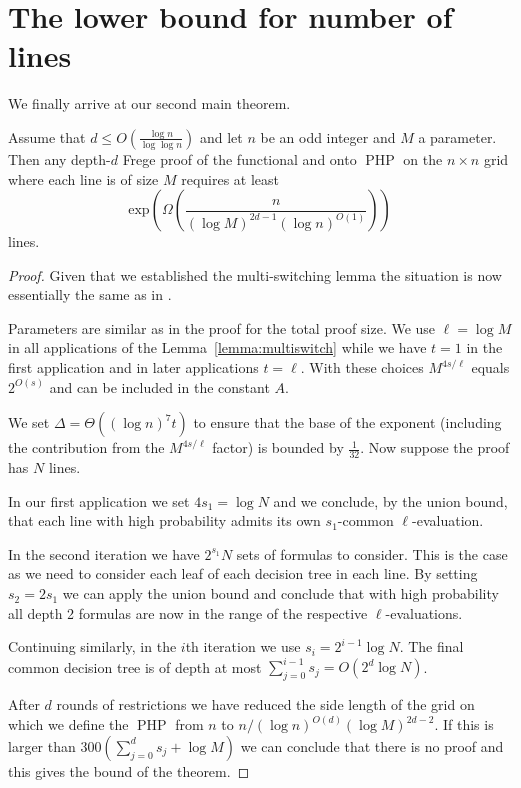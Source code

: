 \documentclass{theoretics}
\DeclareMathOperator{\PHP}{PHP}
\begin{document}
\section{The lower bound for number of
lines}\label{sec:nlines}

We finally arrive at our second main theorem.

\begin{theorem}\label{thm:lines}
Assume that $d \leq O(\frac{\log n}{\log {\log n}})$ and let
$n$ be an odd integer and $M$ a parameter. 
Then any depth-$d$ Frege proof of
the functional and onto $\PHP$ on the $n \times n$ grid where each line
is of size $M$ requires at least
$$
\mbox{exp} \left(\Omega \left(\frac {n}{(\log M)^{2d-1} (\log n)^{O(1)}}\right)\right)
$$
lines.
\end{theorem}

\begin{proof}
Given that we established the multi-switching lemma
the situation is now essentially the same as 
in \cite{jhkr}.  

Parameters are similar as in the proof for the total proof
size.   We use $\ell= \log M$ in all applications
of the Lemma~\ref{lemma:multiswitch}
while we have $t=1$ in the
first application and in later applications $t=\ell$.
With these choices $M^{4s /\ell}$ equals
$2^{O(s)}$ and can be included in the constant $A$.

We set $\Delta = \Theta ((\log n)^7 t)$ to ensure that the 
base of the exponent (including the contribution from the $M^{4s/ \ell}$
factor) is bounded by $\frac 1{32}$.  Now suppose the
proof has $N$ lines.  

In our first application we set $4s_1= \log N$ and
we conclude, by the union bound,  that each line with
high probability admits its own $s_1$-common
$\ell$-evaluation.

In the second iteration we have $2^{s_1} N $ sets of
formulas to consider.  This is the case as we need to consider
each leaf of each decision tree in each line.
By setting $s_2= 2 s_1$ we can apply the union
bound and conclude that with high probability all
depth 2 formulas are now in the range of the
respective $\ell$-evaluations.

Continuing similarly, in the $i$th iteration we use $s_i=2^{i-1} \log N$.
The final common decision tree is 
of depth at most $\sum_{j=0}^{i-1} s_j= O(2^d \log N)$.

After $d$ rounds of restrictions we have reduced the 
side length of the grid on which we define the $\PHP$ from $n$ to $n/ (\log n)^{O(d)} (\log M)^{2d-2}$.
If this is larger than $300(\sum_{j=0}^{d} s_j + \log M)$
we can conclude that there is no proof and this gives
the bound of the theorem.
\end{proof}
\end{document}
